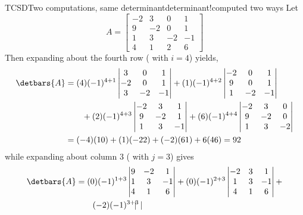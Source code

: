 \begin{example}{TCSD}{Two computations, same determinant}{determinant!computed two ways}
Let 
%
\begin{equation*}
A=
\begin{bmatrix}
-2 & 3 & 0 & 1\\ 
9 & -2 & 0 & 1\\ 
1 & 3 & -2 & -1\\ 
4 & 1 & 2 & 6
\end{bmatrix}
\end{equation*}
%
Then expanding about the fourth row ( with $i=4$) yields,
%
\begin{align*}
\detbars{A}
&=
(4)(-1)^{4+1}
\begin{vmatrix}
 3 & 0 & 1\\ 
 -2 & 0 & 1\\ 
 3 & -2 & -1
\end{vmatrix}
+(1)(-1)^{4+2}
\begin{vmatrix}
-2 &  0 & 1\\ 
9 &  0 & 1\\ 
1 &  -2 & -1
\end{vmatrix}\\
%
&\quad\quad+(2)(-1)^{4+3}
\begin{vmatrix}
-2 & 3 &  1\\ 
9 & -2 &  1\\ 
1 & 3  & -1
\end{vmatrix}
+(6)(-1)^{4+4}
\begin{vmatrix}
-2 & 3 & 0 \\ 
9 & -2 & 0 \\ 
1 & 3 & -2 
\end{vmatrix}\\
&=
(-4)(10)+(1)(-22)+(-2)(61)+6(46)=92
\end{align*}
%
while expanding about column 3 ( with $j=3$) gives
%
\begin{align*}
\detbars{A}
&=
(0)(-1)^{1+3}
\begin{vmatrix}
9 & -2 & 1\\ 
1 & 3 & -1\\ 
4 & 1 & 6
\end{vmatrix}
+
(0)(-1)^{2+3}
\begin{vmatrix}
-2 & 3 & 1\\ 
1 & 3 & -1\\ 
4 & 1 & 6
\end{vmatrix}
+\\
%
&\quad\quad(-2)(-1)^{3+3}
\begin{vmatrix}

\end{vmatrix}
\end{align*}
\end{example}
